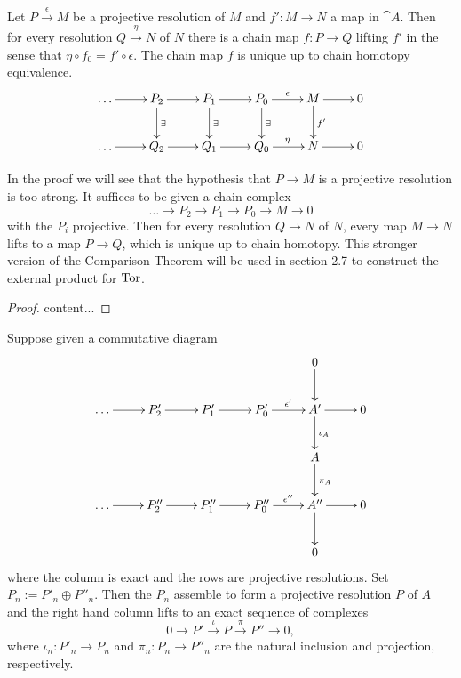 \begin{theorem}
	Let $P\overset{\epsilon}{\rightarrow} M$ be a projective resolution of $M$ and $f':M\rightarrow N$ a map in $\cat{A}$. Then for every resolution $Q\overset{\eta}{\rightarrow} N$ of $N$ there is a chain map $f:P\rightarrow Q$ lifting $f'$ in the sense that $\eta\circ f_0=f'\circ\epsilon$. The chain map $f$ is unique up to chain homotopy equivalence.
	\begin{align*}
		\xymatrix{
			\dots \ar[r] &P_2 \ar[r] \ar[d]^{\exists} &P_1 \ar[r] \ar[d]^{\exists} &P_0 \ar[r]^{\epsilon} \ar[d]^{\exists} &M \ar[r] \ar[d]^{f'} &0 \\
			\dots \ar[r] &Q_2 \ar[r] &Q_1 \ar[r] &Q_0 \ar[r]^{\eta} &N \ar[r] &0 
		}
	\end{align*}
\end{theorem}

\begin{porism}
	In the proof we will see that the hypothesis that $P\rightarrow M$ is a projective resolution is too strong. It suffices to be given a chain complex
	$$\dots \rightarrow P_2 \rightarrow P_1 \rightarrow P_0 \rightarrow M \rightarrow 0$$
	with the $P_i$ projective. Then for every resolution $Q\rightarrow N$ of $N$, every map $M\rightarrow N$ lifts to a map $P\rightarrow Q$, which is unique up to chain homotopy.
	This stronger version of the Comparison Theorem will be used in section 2.7 to construct the external product for $\operatorname{Tor}$.
\end{porism}

\begin{proof}
	content...
\end{proof}

\begin{lemma}
	Suppose given a commutative diagram
	\begin{align*}
		\xymatrix{
			& & & &0 \ar[d] & \\
			\dots \ar[r] &P'_2 \ar[r] &P'_1 \ar[r] &P'_0 \ar[r]^{\epsilon'} &A' \ar[r] \ar[d]^{\iota_A} &0 \\
			& & & &A \ar[d]^{\pi_A} & \\
			\dots \ar[r] &P''_2 \ar[r] &P''_1 \ar[r] &P''_0 \ar[r]^{\epsilon''} &A'' \ar[r] \ar[d] &0 \\
			& & & &0 & 
		}
	\end{align*}
	where the column is exact and the rows are projective resolutions. Set $P_n:=P'_n\oplus P''_n$. Then the $P_n$ assemble to form a projective resolution $P$ of $A$ and the right hand column lifts to an exact sequence of complexes
	$$0\rightarrow P' \overset{\iota}{\rightarrow} P \overset{\pi}{\rightarrow} P'' \rightarrow 0,$$
	where $\iota_n:P'_n\rightarrow P_n$ and $\pi_n:P_n\rightarrow P''_n$ are the natural inclusion and projection, respectively.
\end{lemma}

